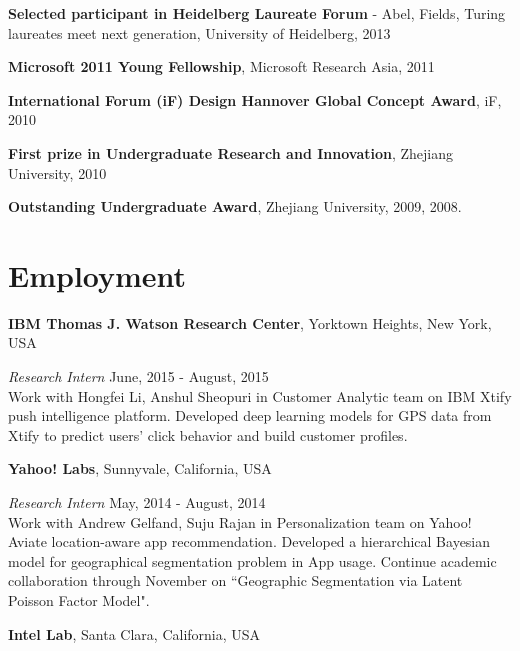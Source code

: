 \documentclass[margin,line]{res}
\begin{document}
\begin{resume}
%

\textbf{Selected participant in Heidelberg Laureate Forum }- Abel, Fields, Turing laureates meet next generation, University of Heidelberg, 2013


\textbf{Microsoft 2011 Young Fellowship}, Microsoft Research Asia, 2011


\textbf{International Forum (iF) Design Hannover Global Concept Award}, iF, 2010 

\textbf{First prize in Undergraduate Research and Innovation}, Zhejiang University, 2010   

\textbf{Outstanding Undergraduate Award}, Zhejiang University, 2009, 2008. 

\section{\sc Employment} 
{\bf  IBM Thomas J. Watson Research Center}, Yorktown Heights, New York, USA

\vspace{-.3cm}
{\em Research Intern} \hfill { June, 2015 - August, 2015}\\
Work with Hongfei Li, Anshul Sheopuri in Customer Analytic team on IBM Xtify push intelligence platform. Developed deep learning models for GPS data from Xtify to predict users' click behavior and build customer profiles. 


{\bf  Yahoo! Labs}, Sunnyvale, California, USA

\vspace{-.3cm}
{\em Research Intern} \hfill { May, 2014 - August, 2014}\\
Work with Andrew Gelfand, Suju Rajan in Personalization team on Yahoo! Aviate location-aware app recommendation. Developed a hierarchical Bayesian model for geographical segmentation problem in App usage. Continue academic collaboration through November on ``Geographic Segmentation via Latent Poisson Factor Model".



{\bf  Intel Lab}, Santa Clara, California, USA


\end{resume}
\end{document}
